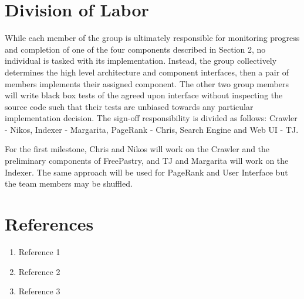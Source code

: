 \documentclass[11pt, letterpaper, oneside, twocolumn]{article}
\begin{document}
\section{ Division of Labor }

While each member of the group is ultimately responsible for monitoring progress and completion of one of the four components described in Section 2, no individual is tasked with its implementation.  Instead, the group collectively determines the high level architecture and component interfaces, then a pair of members implements their assigned component.  The other two group members will write black box tests of the agreed upon interface without inspecting the source code such that their tests are unbiased towards any particular implementation decision. The sign-off responsibility is divided as follows: Crawler - Nikos, Indexer - Margarita, PageRank - Chris, Search Engine and Web UI - TJ.

For the first milestone, Chris and Nikos will work on the Crawler and the preliminary components of FreePastry, and TJ and Margarita will work on the Indexer. The same approach will be used for PageRank and User Interface but the team members may be shuffled.


\section{References}

\begin{enumerate}
\item Reference 1
\item Reference 2
\item Reference 3
\end{enumerate}
\end{document}
